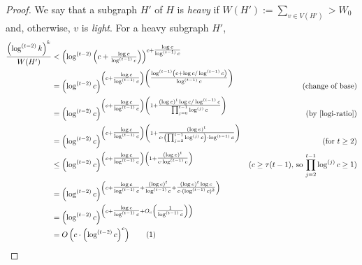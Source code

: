 \documentclass[kpfonts]{patmorin}
\newcommand\numberthis{\addtocounter{equation}{1}\tag{\theequation}}
\theoremstyle{named}
\begin{document}
\begin{proof}

    We say that a subgraph $H'$ of $H$ is \emph{heavy} if
        $W(H'):=\sum_{v\in V(H')} > W_0$ and,
    otherwise, $v$ is \emph{light}.  For a heavy subgraph $H'$,
    \begin{align*}
        \frac{\left(\log^{(t-2)} k\right)^k}{W(H')}
        & < \left(\log^{(t-2)}\left(c+\tfrac{\log c}{\log^{(t-1)} c}\right)\right)^{c+\tfrac{\log c}{\log^{(t-1)} c}} \\
        & = \left(\log^{(t-2)}c\right)^{\left(c+\tfrac{\log c}{\log^{(t-1)} c}\right)
        \left(\tfrac{\log^{(t-1)}\left(c+\log c/\log^{(t-1)} c\right)}{\log^{(t-1)} c}\right)} &\text{(change of base)} \\
        & = \left(\log^{(t-2)}c\right)^{\left(c+\tfrac{\log c}{\log^{(t-1)} c}\right)
        \left(
        1 + \tfrac{(\log e)^t\log c/\log^{(t-1)} c}{\prod_{j=0}^{t-1}\log^{(j)}c}
        \right)} & \text{(by \cref{logi-ratio})} \\
        & = \left(\log^{(t-2)}c\right)^{\left(c+\tfrac{\log c}{\log^{(t-1)} c}\right)
        \left(
        1 + \tfrac{(\log e)^t}{c\cdot\left(\prod_{j=2}^{t-1}\log^{(j)}c\right)\cdot\log^{(t-1)} c}
        \right)} & \text{(for $t\ge 2$)} \\
        & \le \left(\log^{(t-2)}c\right)^{\left(c+\tfrac{\log c}{\log^{(t-1)} c}\right)
        \left(
        1 + \tfrac{(\log e)^t}{c\cdot\log^{(t-1)} c}
        \right)} & \text{($c\ge \tau(t-1)$, so $\prod_{j=2}^{t-1}\log^{(j)}c\ge 1$)} \\
        & = \left(\log^{(t-2)}c\right)^{\left(c+\tfrac{\log c}{\log^{(t-1)} c}+
        \tfrac{(\log e)^t}{\log^{(t-1)} c} + \tfrac{(\log e)^t\log c}{c\cdot(\log^{(t-1)} c)^2}
        \right)}  \\
        & = \left(\log^{(t-2)}c\right)^{\left(c+\tfrac{\log c}{\log^{(t-1)} c}
          + O_c\left(\tfrac{1}{\log^{(t-1)} c}\right)
        \right)}  \\
        & = O\left(c\cdot\left(\log^{(t-2)}c\right)^c\right)  \numberthis \label{heavy-size}
    \end{align*}


\end{proof}
\end{document}
